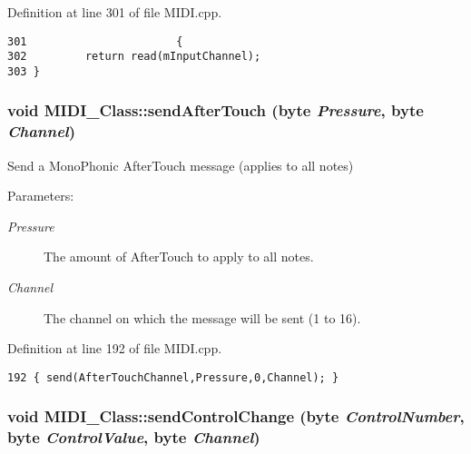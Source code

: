 Definition at line 301 of file MIDI.cpp.

\begin{Code}\begin{verbatim}301                       {
302         return read(mInputChannel);
303 }
\end{verbatim}
\end{Code}


\hypertarget{class_m_i_d_i___class_73b57f656a80166b98dc1b57ea9a56dc}{
\subsubsection[{sendAfterTouch}]{\setlength{\rightskip}{0pt plus 5cm}void MIDI\_\-Class::sendAfterTouch ({\bf byte} {\em Pressure}, \/  {\bf byte} {\em Channel})}}
\label{class_m_i_d_i___class_73b57f656a80166b98dc1b57ea9a56dc}


Send a MonoPhonic AfterTouch message (applies to all notes) \begin{Desc}
\item[Parameters:]
\begin{description}
\item[{\em Pressure}]The amount of AfterTouch to apply to all notes. \item[{\em Channel}]The channel on which the message will be sent (1 to 16). \end{description}
\end{Desc}


Definition at line 192 of file MIDI.cpp.

\begin{Code}\begin{verbatim}192 { send(AfterTouchChannel,Pressure,0,Channel); }
\end{verbatim}
\end{Code}


\hypertarget{class_m_i_d_i___class_3a80e9bd2cfdb619be91d80e8f3b7825}{
\subsubsection[{sendControlChange}]{\setlength{\rightskip}{0pt plus 5cm}void MIDI\_\-Class::sendControlChange ({\bf byte} {\em ControlNumber}, \/  {\bf byte} {\em ControlValue}, \/  {\bf byte} {\em Channel})}}
\label{class_m_i_d_i___class_3a80e9bd2cfdb619be91d80e8f3b7825}


